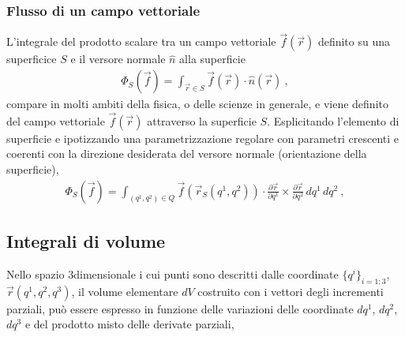\documentclass[letterpaper,10pt,italian]{jupyterBook}
\begin{document}
\subsubsection{Flusso di un campo vettoriale}
\label{\detokenize{ch/vector-calculus/integrals:flusso-di-un-campo-vettoriale}}\label{\detokenize{ch/vector-calculus/integrals:vector-calculus-integrals-surface-flux}}
\sphinxAtStartPar
L’integrale del prodotto scalare tra un campo vettoriale \(\vec{f}(\vec{r})\) definito su una superficice \(S\) e il versore normale \(\hat{n}\) alla superficie
\begin{equation}\label{equation:ch/vector-calculus/integrals:eq:integral:flux}
\begin{split}\Phi_{S}(\vec{f}) = \int_{\vec{r} \in S} \vec{f}(\vec{r}) \cdot \hat{n}(\vec{r}) \ ,\end{split}
\end{equation}
\sphinxAtStartPar
compare in molti ambiti della fisica, o delle scienze in generale, e viene definito  del campo vettoriale \(\vec{f}(\vec{r})\) attraverso la superficie \(S\). Esplicitando l’elemento di superficie e ipotizzando una parametrizzazione regolare con parametri crescenti e coerenti con la direzione desiderata del versore normale (orientazione della superficie),
\begin{equation}\label{equation:ch/vector-calculus/integrals:eq:integral:flux:coords}
\begin{split}\Phi_{S}(\vec{f}) = \int_{(q^1, q^2) \in Q} \vec{f}(\vec{r}_S(q^1, q^2)) \cdot \frac{\partial \vec{r}}{\partial q^1} \times \frac{\partial \vec{r}}{\partial q^2} \, d q^1 \, d q^2 \ ,\end{split}
\end{equation}

\subsection{Integrali di volume}
\label{\detokenize{ch/vector-calculus/integrals:integrali-di-volume}}\label{\detokenize{ch/vector-calculus/integrals:vector-calculus-integrals-volume}}
\sphinxAtStartPar
Nello spazio 3\sphinxhyphen{}dimensionale i cui punti sono descritti dalle coordinate \(\{ q^i \}_{i=1:3}\), \(\vec{r}(q^1, q^2, q^3)\), il volume elementare \(dV\) costruito con i vettori degli incrementi parziali, può essere espresso in funzione delle variazioni delle coordinate \(d q^1\), \(d q^2\), \(d q^3\) e del prodotto misto delle derivate parziali,
\end{document}
